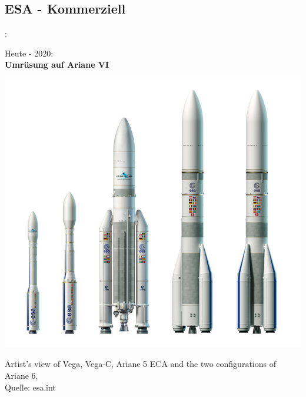 \documentclass{beamer}
\begin{document}
\subsection{ESA - Kommerziell}
\begin{frame}{\insertsection: \insertsubsection}
	\begin{minipage}{.45\textwidth}
		
		Heute - 2020: \\
		\textbf{Umrüsung auf Ariane VI} \\
		
				
			\end{minipage} \quad
			\begin{minipage}{.5\textwidth}
				\includegraphics[width=\linewidth]{arianevi}
					
					{\tiny Artist's view of Vega, Vega-C, Ariane 5 ECA and the 
					two configurations of Ariane 6,
						\\ Quelle: esa.int}
			\end{minipage}
\end{frame}
\end{document}
